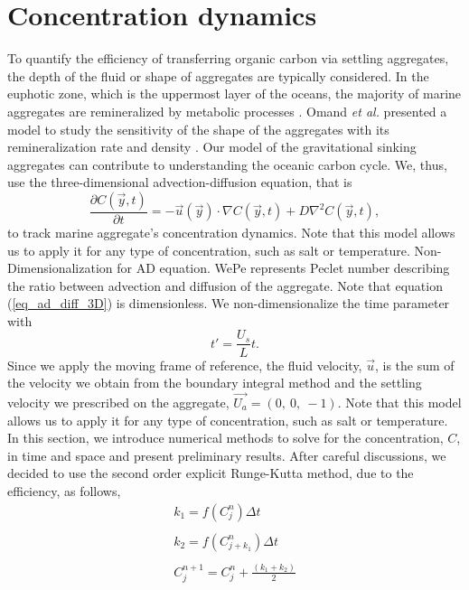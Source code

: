 \section{Concentration dynamics}
To quantify the efficiency of transferring organic carbon via settling aggregates, the depth of the fluid or shape of aggregates are typically considered.
In the euphotic zone, which is the uppermost layer of the oceans, the majority of marine aggregates are remineralized by metabolic processes \cite{henson_global_2012}. Omand {\it{et al.}} presented a model to study the sensitivity of the shape of the aggregates with its remineralization rate and density \cite{omand_sinking_2020}. 
Our model of the gravitational sinking aggregates can contribute to understanding the oceanic carbon cycle. We, thus, use the three-dimensional advection-diffusion equation, that is 
\begin{equation}
	\frac{\partial C(\vec{y}, t) }{\partial t} 
	= - \vec{u}(\vec{y}) \cdot \nabla C(\vec{y}, t)
	+ D \nabla^2 C(\vec{y}, t),
	\label{eq_ad_diff_3D}
\end{equation} 
to track marine aggregate's concentration dynamics.
Note that this model allows us to apply it for any type of concentration, such as salt or temperature. 
{\color{blue}Non-Dimensionalization for AD equation.}
WePe represents Peclet number describing the ratio between advection and diffusion of the aggregate. 
Note that equation (\ref{eq_ad_diff_3D}) is dimensionless. We non-dimensionalize the time parameter with 
\[
t' = \frac{U_s}{L} t.
\]
Since we apply the moving frame of reference, the fluid velocity, $\vec{u}$, is the sum of the velocity we obtain from the boundary integral method and the settling velocity we prescribed on the aggregate, $\vec{U_a} = (0, \ 0, \ -1)$.
Note that this model allows us to apply it for any type of concentration, such as salt or temperature. 
In this section, we introduce numerical methods to solve for the concentration, $C$, in time and space and present preliminary results.
After careful discussions, we decided to use the second order explicit Runge-Kutta method, due to the efficiency, as follows,
\begin{align}
	k_1 =  f \left( C_j^{n} \right) \Delta t \\ \nonumber
	\\ 
	k_2 = f \left(C_{j+k_1}^{n} \right) \Delta t\\ \nonumber
	\\ 
	C_j^{n+1} = C_j^{n} + \frac{\left(k_1 + k_2 \right)}{2}
\end{align}
